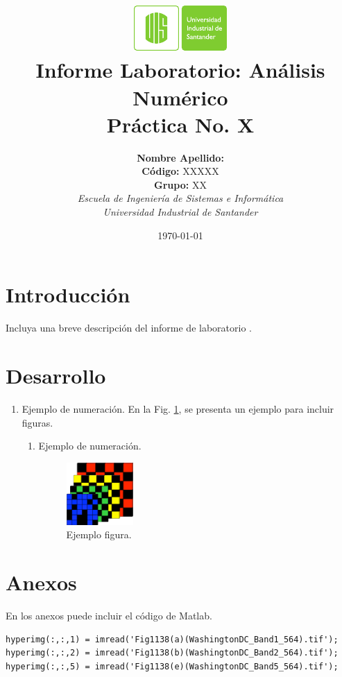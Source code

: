 \documentclass[english,notitlepage,letterpaper, 10pt]{article} %
\newcommand{\university}{\normalsize Universidad Industrial de Santander}
\newcommand{\faculty}{\normalsize  Escuela de Ingenier\'ia de Sistemas e Inform\'atica}
\newcommand{\codigo}{\normalsize  XXXXX}
\newcommand{\grupo}{\normalsize  XX}
\begin{document}
\title{	\vspace{-12mm}\includegraphics[width=0.2\linewidth]{Logos/UIS.pdf}\\Informe Laboratorio: An\'alisis Num\'erico\\  \centering Pr\'actica No. X}
\author{
\textbf{Nombre Apellido:} \\ \textbf{C\'odigo:} \codigo\\
\textbf{Grupo:} \grupo\\
\textit{\faculty}\\
\textit{\university}}
\date{\today}
\maketitle

\section{Introducci\'on}
Incluya una breve descripci\'on del informe de laboratorio \cite{ejemplo}. 

\section{Desarrollo}

\begin{enumerate}
	\item Ejemplo de numeraci\'on. En la Fig. \ref{Figura4}, se presenta un ejemplo para incluir figuras.
	\begin{enumerate}
	\item Ejemplo de numeraci\'on.
			
			\begin{figure}[!h]
				\begin{center}
					\includegraphics[width=1.0in]{Images/imagen1.pdf}
					\caption{Ejemplo figura.}
					\label{Figura4}
				\end{center}
			\end{figure}

	\end{enumerate}

\end{enumerate}
\newpage
\section{Anexos}
En los anexos puede incluir el c\'odigo de Matlab.

\begin{lstlisting} 
hyperimg(:,:,1) = imread('Fig1138(a)(WashingtonDC_Band1_564).tif');
hyperimg(:,:,2) = imread('Fig1138(b)(WashingtonDC_Band2_564).tif');
hyperimg(:,:,5) = imread('Fig1138(e)(WashingtonDC_Band5_564).tif');
\end{lstlisting}




\end{document}
